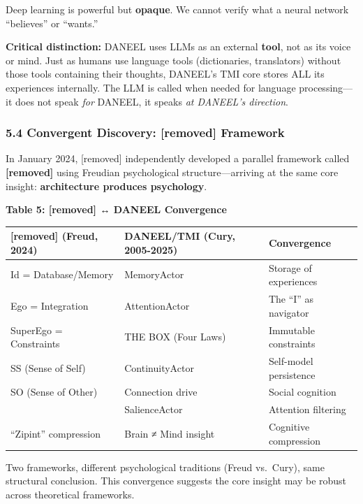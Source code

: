 \documentclass[
  11pt,
]{article}
\newcounter{none} %
\begin{document}
Deep learning is powerful but \textbf{opaque}. We cannot verify what a
neural network ``believes'' or ``wants.''

\textbf{Critical distinction:} DANEEL uses LLMs as an external
\textbf{tool}, not as its voice or mind. Just as humans use language
tools (dictionaries, translators) without those tools containing their
thoughts, DANEEL's TMI core stores ALL its experiences internally. The
LLM is called when needed for language processing---it does not speak
\emph{for} DANEEL, it speaks \emph{at DANEEL's direction}.

\subsubsection{5.4 Convergent Discovery: [removed]
Framework}\label{convergent-discovery-[removed]-framework}

In January 2024, [removed] independently developed a parallel
framework called \textbf{[removed]} using Freudian psychological
structure---arriving at the same core insight: \textbf{architecture
produces psychology}.

\textbf{Table 5: [removed] ↔ DANEEL Convergence}

{\def\LTcaptype{none} %
\begin{longtable}[]{@{}lll@{}}
\toprule\noalign{}
[removed] (Freud, 2024) & DANEEL/TMI (Cury, 2005-2025) & Convergence \\
\midrule\noalign{}
\endhead
\bottomrule\noalign{}
\endlastfoot
Id = Database/Memory & MemoryActor & Storage of experiences \\
Ego = Integration & AttentionActor & The ``I'' as navigator \\
SuperEgo = Constraints & THE BOX (Four Laws) & Immutable constraints \\
SS (Sense of Self) & ContinuityActor & Self-model persistence \\
SO (Sense of Other) & Connection drive & Social cognition \\
[removed] & SalienceActor & Attention filtering \\
``Zipint'' compression & Brain ≠ Mind insight & Cognitive compression \\
\end{longtable}
}

Two frameworks, different psychological traditions (Freud vs.~Cury),
same structural conclusion. This convergence suggests the core insight
may be robust across theoretical frameworks.
\end{document}

